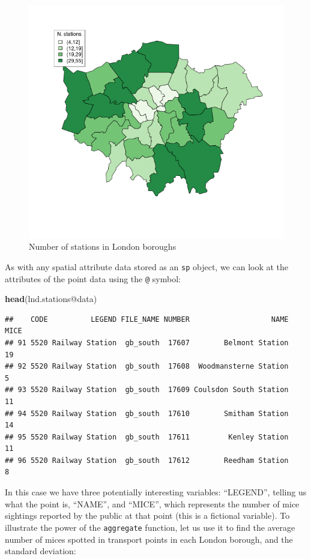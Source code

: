 \documentclass[]{article}
\makeatletter
\newenvironment{Shaded}{}{}
\newcommand{\KeywordTok}[1]{\textcolor[rgb]{0.00,0.44,0.13}{\textbf{{#1}}}}
\newcommand{\NormalTok}[1]{{#1}}
\def\maxwidth{\ifdim\Gin@nat@width>\linewidth\linewidth
\else\Gin@nat@width\fi}
\let\Oldincludegraphics\includegraphics
\renewcommand{\includegraphics}[1]{\Oldincludegraphics[width=\maxwidth]{#1}}
\makeatother
\begin{document}
\begin{figure}[htbp]
\centering
\includegraphics{figure/nStations.png}
\caption{Number of stations in London boroughs}
\end{figure}

As with any spatial attribute data stored as an \texttt{sp} object, we
can look at the attributes of the point data using the \texttt{@}
symbol:

\begin{Shaded}
\begin{Highlighting}[]
\KeywordTok{head}\NormalTok{(lnd.stations@data)}
\end{Highlighting}
\end{Shaded}
\begin{verbatim}
##    CODE          LEGEND FILE_NAME NUMBER                   NAME MICE
## 91 5520 Railway Station  gb_south  17607        Belmont Station   19
## 92 5520 Railway Station  gb_south  17608  Woodmansterne Station    5
## 93 5520 Railway Station  gb_south  17609 Coulsdon South Station   11
## 94 5520 Railway Station  gb_south  17610        Smitham Station   14
## 95 5520 Railway Station  gb_south  17611         Kenley Station   11
## 96 5520 Railway Station  gb_south  17612        Reedham Station    8
\end{verbatim}
In this case we have three potentially interesting variables:
``LEGEND'', telling us what the point is, ``NAME'', and ``MICE'', which
represents the number of mice sightings reported by the public at that
point (this is a fictional variable). To illustrate the power of the
\texttt{aggregate} function, let us use it to find the average number of
mices spotted in transport points in each London borough, and the
standard deviation:
\end{document}
